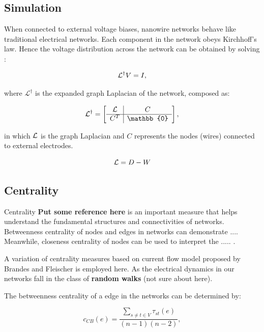 \documentclass[%
 reprint,
 amsmath,amssymb,
 aps,
]{revtex4-2}
\begin{document}
\subsection{\label{sec:level2} Simulation}
When connected to external voltage biases, nanowire networks behave like traditional electrical networks. Each component in the network obeys Kirchhoff's law. Hence the voltage distribution across the network can be obtained by solving \cite{Dorfler2018}:

\begin{equation}
{\cal L}^\dagger V = I,
\end{equation}

where $\mathcal{L}^\dagger$ is the expanded graph Laplacian of the network, composed as:

\begin{equation}
	\cal L^\dagger = 
	\left[
	\begin{array}{c|c}
	\cal L&  C\\ 
	\hline
	C^T & \mathbb{0}  
	\end{array}
	\right],
\end{equation}

in which $\cal L$ is the graph Laplacian and $C$ represents the nodes (wires) connected to external electrodes. 

\begin{equation}
{\cal L} = D - W
\end{equation}

\subsection{\label{sec:level2} Centrality}
Centrality \textbf{Put some reference here} is an important measure that helps understand the fundamental structures and connectivities of networks. Betweenness centrality of nodes and edges in networks can demonstrate .... Meanwhile, closeness centrality of nodes can be used to interpret the ..... \cite{Newman2010}.

A variation of centrality measures based on current flow model proposed by Brandes and Fleischer \cite{Brandes2005} is employed here. As the electrical dynamics in our networks fall in the class of \textbf{random walks} (not sure about here).

The betweenness centrality of a edge in the networks can be determined by:

\begin{equation}
c_{CB}(e) = \frac{\sum \limits_{s \neq t \in V}\tau_{st}(e)}{(n-1)(n-2)},
\end{equation}
\end{document}

